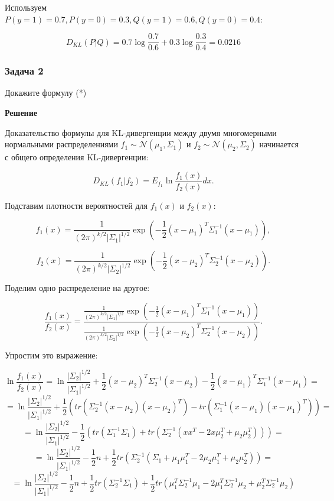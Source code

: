 Используем  $P(y=1) = 0.7,  P(y=0) = 0.3,  Q(y=1) = 0.6 ,  Q(y=0) = 0.4$:

\[
    D_{KL}(P | Q) = 0.7 \log \frac{0.7}{0.6} + 0.3 \log \frac{0.3}{0.4} = 0.0216
\]

\subsubsection*{Задача 2}
Докажите формулу (*)

\textbf{Решение}

Доказательство формулы для KL-дивергенции между двумя многомерными нормальными распределениями $f_1 \sim \mathcal{N}(\mu_1, \Sigma_1)$ и $f_2 \sim \mathcal{N}(\mu_2, \Sigma_2) $ начинается с общего определения KL-дивергенции:

\[
    D_{KL}(f_1 | f_2) = E_{f_1} \ln \frac{f_1(x)}{f_2(x)} dx.
\]

Подставим плотности вероятностей для $f_1(x)$ и $f_2(x)$:

\[
    f_1(x) = \frac{1}{(2\pi)^{k/2} |\Sigma_1|^{1/2}} \exp\left(-\frac{1}{2}(x - \mu_1)^T \Sigma_1^{-1} (x - \mu_1)\right),
\]

\[
    f_2(x) = \frac{1}{(2\pi)^{k/2} |\Sigma_2|^{1/2}} \exp\left(-\frac{1}{2}(x - \mu_2)^T \Sigma_2^{-1} (x - \mu_2)\right).
\]



Поделим одно распределение на другое:

\[
    \frac{f_1(x)}{f_2(x)} = \frac{\frac{1}{(2\pi)^{k/2} |\Sigma_1|^{1/2}} \exp\left(-\frac{1}{2}(x - \mu_1)^T \Sigma_1^{-1} (x - \mu_1)\right)}{\frac{1}{(2\pi)^{k/2} |\Sigma_2|^{1/2}} \exp\left(-\frac{1}{2}(x - \mu_2)^T \Sigma_2^{-1} (x - \mu_2)\right)}.
\]

Упростим это выражение:

\[
    \ln \frac{f_1(x)}{f_2(x)} = \ln \frac{|\Sigma_2|^{1/2}}{|\Sigma_1|^{1/2}} + \frac{1}{2}(x - \mu_2)^T \Sigma_2^{-1} (x - \mu_2) - \frac{1}{2}(x - \mu_1)^T \Sigma_1^{-1} (x - \mu_1) =  \]
\[
    = \ln \frac{|\Sigma_2|^{1/2}}{|\Sigma_1|^{1/2}} + \frac{1}{2}(tr(\Sigma_2^{-1}(x - \mu_2)(x - \mu_2)^T) - tr(\Sigma_1^{-1}(x - \mu_1)(x - \mu_1)^T)) =
\]
\[
    = \ln \frac{|\Sigma_2|^{1/2}}{|\Sigma_1|^{1/2}} -\frac{1}{2}(tr(\Sigma_1^{-1}\Sigma_1) + tr(\Sigma_2^{-1}(xx^T - 2x \mu_2^T + \mu_2 \mu_2^T))) =
\]
\[
    = \ln \frac{|\Sigma_2|^{1/2}}{|\Sigma_1|^{1/2}} -\frac{1}{2}n + \frac{1}{2} tr(\Sigma_2^{-1} (\Sigma_1 + \mu_1 \mu_1^T - 2\mu_2 \mu_1^T + \mu_2 \mu_2 ^T)) =
\]
\[
    = \ln \frac{|\Sigma_2|^{1/2}}{|\Sigma_1|^{1/2}}  - \frac{1}{2}n  + \frac{1}{2}tr(\Sigma_2^{-1}\Sigma_1) + \frac{1}{2}tr(\mu_1^T \Sigma_2^{-1} \mu_1 - 2\mu_1^T \Sigma_2^{-1} \mu_2 + \mu_2^T\Sigma_2^{-1}\mu_2)
\]

